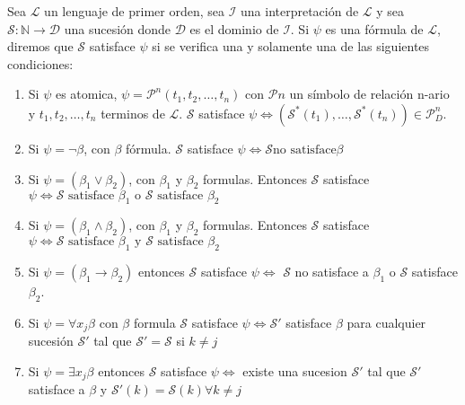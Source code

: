 \begin{definition}

Sea $\mathcal{L}$ un lenguaje de primer orden, sea $\mathcal{I}$ una interpretaci\'on de $\mathcal{L}$ y sea $\mathcal{S} : \mathbb{N} \rightarrow \mathcal{D}$ una sucesi\'on donde $\mathcal{D}$ es el dominio de $\mathcal{I}$. Si $\psi$ es una f\'ormula de $\mathcal{L}$, diremos que $\mathcal{S}$ satisface $\psi$ si se verifica una y solamente una de las siguientes condiciones:

\begin{enumerate}
	\item Si $\psi$ es atomica, $\psi = \mathcal{P}^{n}(t_1, t_2, \ldots, t_n)$ con $\mathcal{P}{n}$ un s\'imbolo de relaci\'on n-ario  y $t_1, t_2, \ldots, t_n$ terminos de $\mathcal{L}$. $\mathcal{S}$ satisface $\psi \iff (\mathcal{S}^{*}(t_1), \ldots, \mathcal{S}^{*}(t_n)) \in \mathcal{P}^{n}_{D}$.
	\item Si $\psi = \neg \beta$, con $\beta$ f\'ormula. $\mathcal{S}$ satisface $\psi \iff \mathcal{S} \text{no satisface} \beta$
	\item Si $\psi = (\beta_1 \lor \beta_2)$, con $\beta_1$ y $\beta_2$ formulas. Entonces $\mathcal{S}$ satisface $\psi \iff \mathcal{S} \text{ satisface } \beta_1 \text{ o } \mathcal{S} \text{ satisface } \beta_2$
	\item Si $\psi = (\beta_1 \land \beta_2)$, con $\beta_1$ y $\beta_2$ formulas. Entonces $\mathcal{S}$ satisface $\psi \iff \mathcal{S} \text{ satisface } \beta_1 \text{ y } \mathcal{S} \text{ satisface } \beta_2$
	\item Si $\psi = (\beta_1 \rightarrow \beta_2)$ entonces $\mathcal{S}$ satisface $\psi \iff $ $\mathcal{S}$ no satisface a $\beta_1$ o $\mathcal{S}$ satisface $\beta_2$.
	\item Si $\psi = \forall x_j \beta$ con $\beta$ formula $\mathcal{S}$ satisface $\psi \iff \mathcal{S}'$ satisface $\beta$ para cualquier sucesi\'on $\mathcal{S}'$ tal que $\mathcal{S}' = \mathcal{S}$ si $k \neq j$
	\item Si $\psi = \exists x_j \beta$ entonces $\mathcal{S}$ satisface $\psi \iff$ existe una sucesion $\mathcal{S}'$ tal que $\mathcal{S}'$ satisface a $\beta$ y $\mathcal{S}'(k) = \mathcal{S}(k) \forall k \neq j$ 
\end{enumerate}

\end{definition}

